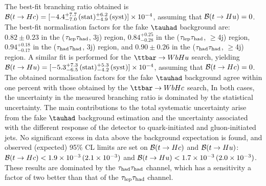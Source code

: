 The best-fit branching ratio obtained is $\mathcal{B}(t\to Hc)=[-4.4^{+7.7}_{-7.0}\,(\mathrm{stat})^{+6.2}_{-4.9}\,(\mathrm{syst})] \times 10^{-4}$, assuming that $\mathcal{B}(t\to Hu)=0$. 
The best-fit normalisation factors for the fake $\tauhad$ background are: $0.82 \pm 0.23$ in the ($\tau_{\mathrm{lep}} \tau_{\mathrm{had}}$, 3j) region, $0.84^{+0.25}_{-0.28}$ in the ($\tau_{\mathrm{lep}} \tau_{\mathrm{had}}$, $\geq$4j) region,
$0.94^{+0.18}_{-0.17}$ in the ($\tau_{\mathrm{had}} \tau_{\mathrm{had}}$, 3j) region, and $0.90 \pm 0.26$ in the ($\tau_{\mathrm{had}} \tau_{\mathrm{had}}$, $\geq$4j) region.
A similar fit is performed for the $\Hu$ search, yielding $\mathcal{B}(t\to Hu)=[-5.3^{+7.3}_{-6.5}\,(\mathrm{stat})^{+5.3}_{-4.2}\,(\mathrm{syst})] \times 10^{-4}$,
assuming that $\mathcal{B}(t\to Hc)=0$. The obtained normalisation factors for the fake $\tauhad$ background agree within one percent with those obtained by the $\Hc$ search,
In both cases, the uncertainty in the measured branching ratio is dominated by the statistical uncertainty.
The main contributions to the total systematic uncertainty arise from the fake $\tauhad$ background estimation and the uncertainty associated
with the different response of the detector to quark-initiated and gluon-initiated jets. 
No significant excess in data above the background expectation is found, 
and observed (expected) 95\% CL limits are set on $\mathcal{B}(t\to Hc)$ and $\mathcal{B}(t\to Hu)$:
$\mathcal{B}(t\to Hc)<1.9 \times 10^{-3}\,(2.1 \times 10^{-3})$ and $\mathcal{B}(t\to Hu)<1.7 \times 10^{-3}\,(2.0 \times 10^{-3})$.
These results are dominated by the $\tau_{\mathrm{had}} \tau_{\mathrm{had}}$ channel, which has a sensitivity a factor of two better than that of the $\tau_{\mathrm{lep}} \tau_{\mathrm{had}}$ channel.


